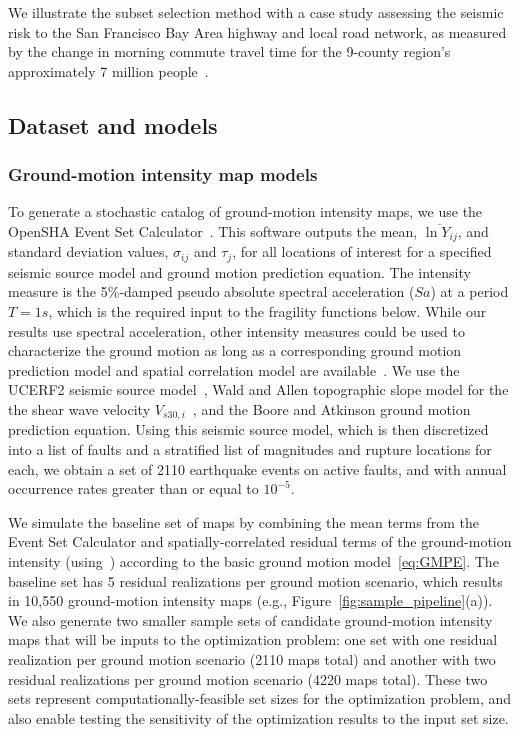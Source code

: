 We illustrate the subset selection method with a case study assessing the seismic risk to the San Francisco Bay Area highway and local road network, as measured by the change in morning commute travel time for the 9-county region's approximately 7 million people~\cite{carr_study_2007}. 

\subsection{Dataset and models}

\subsubsection{Ground-motion intensity map models}

To generate a stochastic catalog of ground-motion intensity maps, we use the OpenSHA Event Set Calculator~\cite{field_opensha:_2003}. This software outputs the mean, $\overline{\ln Y_{ij}}$, and standard deviation values, $\sigma_{ij}$ and $\tau_j$, for all locations of interest for a specified seismic source model and ground motion prediction equation. The intensity measure is the 5\%-damped pseudo absolute  spectral acceleration ($Sa$) at a period $T=1s$, which is the required input to the fragility functions below. While our results use spectral acceleration, other intensity measures could be used to characterize the ground motion as long as a corresponding ground motion prediction model and spatial correlation model are available~\cite[e.g.,][]{foulser-piggott_predictive_2012}. %
We use the UCERF2 seismic source model~\cite{field_uniform_2009}, Wald and Allen topographic slope model for the the shear wave velocity $V_{s30,i}$~\cite{wald_topographic_2007}, and the Boore and Atkinson \cite{boore_ground-motion_2008} ground motion prediction equation.   Using this seismic source model, which is then discretized into a list of faults and a stratified list of magnitudes and rupture locations for each, we obtain a set of 2110 earthquake events on active faults, and with annual occurrence rates greater than or equal to $10^{-5}$.


We simulate the baseline set of maps by combining the mean terms from the Event Set Calculator and spatially-correlated residual terms of the ground-motion intensity  (using~\cite{jayaram_correlation_2009}) according to the basic ground motion model~\eqref{eq:GMPE}. The baseline set has 5 residual realizations per ground motion scenario, which results in 10,550 ground-motion intensity maps (e.g., Figure~\ref{fig:sample_pipeline}{\color{red}(a)}).  We also generate two smaller sample sets of candidate ground-motion intensity maps that will be inputs to the optimization problem: one set with one residual realization per ground motion scenario (2110 maps total) and another with two residual realizations per ground motion scenario (4220 maps total). These two sets represent computationally-feasible set sizes for the optimization problem, and also enable testing the sensitivity of the optimization results to the input set size.

